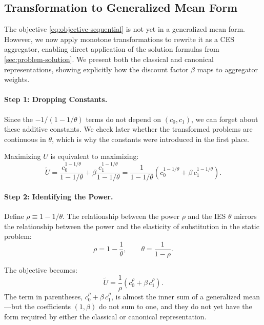\subsection{Transformation to Generalized Mean Form}
\label{subsec:transformation-canonical}

The objective \cref{eq:objective-sequential} is not yet in a generalized mean form. However, we now apply monotone transformations to rewrite it as a CES aggregator, enabling direct application of the solution formulas from \cref{sec:problem-solution}. We present both the classical and canonical representations, showing explicitly how the discount factor $\beta$ maps to aggregator weights.

\paragraph{Step 1: Dropping Constants.}
Since the $-1/(1-1/\theta)$ terms do not depend on $(c_0, c_1)$, we can forget about these additive constants. We check later whether the transformed problems are continuous in $\theta$, which is why the constants were introduced in the first place. 

Maximizing $U$ is equivalent to maximizing:
\begin{equation}
\tilde{U} = \frac{c_0^{1-1/\theta}}{1 - 1/\theta} + \beta \frac{c_1^{1-1/\theta}}{1 - 1/\theta} = \frac{1}{1-1/\theta} \left( c_0^{1-1/\theta} + \beta \, c_1^{1-1/\theta} \right).
\label{eq:U-tilde}
\end{equation}

\paragraph{Step 2: Identifying the Power.}
Define $\rho \equiv 1 - 1/\theta$. The relationship between the power $\rho$ and the IES $\theta$ mirrors the relationship between the power and the elasticity of substitution in the static problem:
\begin{equation}
\rho = 1 - \frac{1}{\theta}, \qquad \theta = \frac{1}{1 - \rho}.
\label{eq:rho-theta}
\end{equation}

The objective becomes:
\begin{equation}
\tilde{U} = \frac{1}{\rho} \left( c_0^{\rho} + \beta \, c_1^{\rho} \right).
\label{eq:U-power}
\end{equation}
The term in parentheses, $c_0^{\rho} + \beta \, c_1^{\rho}$, is almost the inner sum of a generalized mean---but the coefficients $(1, \beta)$ do not sum to one, and they do not yet have the form required by either the classical or canonical representation.

